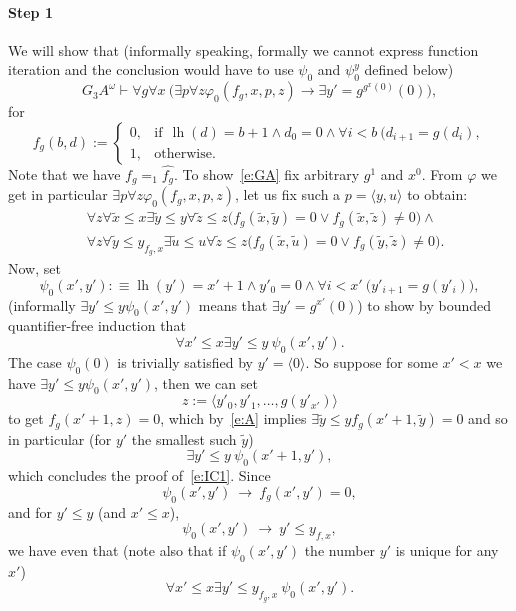 \documentclass[1p]{elsarticle}
\newcommand{\be}[1][{e:\arabic{equation}}] { \begin{equation}\label{#1} }
\newcommand{\ee} { \end{equation} }
\DeclareMathOperator{\lh}{lh}  %
\newcommand{\Tif}{\text{if}\ }
\newcommand{\Telse}{\text{otherwise}}
\theoremstyle{plain}
\theoremstyle{definition}
\theoremstyle{remark}
\renewenvironment{proof}[1][]{\noindent{\bf Proof{#1}. }}{\nopagebreak[4]{\hspace*{\fill}
  $\Box$              %
 }{\vspace{2ex}}}
\renewcommand{\phi}{\varphi}
\theoremstyle{definition}
\begin{document}
{\begin{proof}
\paragraph{Step 1} We will show that (informally speaking, formally we cannot express function iteration and the conclusion would have to use $\psi_0$ and $\psi^y_0$ defined below)
\[
G_3A^\omega\vdash \forall g \forall x\ \big(\exists p\forall z\phi_0(f_g,x,p,z)\rightarrow \exists y'=g^{g^{x}(0)}(0)\big),
\tag{GA}\label{e:GA}
\]
for \[
f_g(b,d):=\begin{cases}
0,&\Tif \ \lh(d) = b+1 \wedge d_0=0\wedge \forall i< b\ (d_{i+1}=g(d_i),\\
1,&\Telse.
\end{cases}
\]
Note that we have $f_g=_1\widehat{f_g}$. To show~\eqref{e:GA} fix arbitrary $g^1$ and $x^0$.
From $\phi$ we get in particular $\exists p\forall z\phi_0(f_g,x,p,z)$, let us fix such a $p=\langle y,u\rangle$ to obtain:
\begin{align}
&\forall z\forall\tilde x \leq x \exists \tilde y\leq y \forall \tilde z\leq z 
\big(f_g(\tilde x,\tilde y)=0\vee f_g(\tilde x,\tilde z)\neq0\big) \label{e:A}
\wedge \\
&\forall z\forall\tilde y \leq y_{f_g,x} \exists \tilde u\leq u \forall \tilde z\leq z 
\big(f_g(\tilde x,\tilde u)=0\vee f_g(\tilde y,\tilde z)\neq0\big). \label {e:B}
\end{align}
Now, set 
\[
\psi_0(x',y'):\equiv \lh(y')=x'+1 \wedge y'_0=0 \wedge \forall i< x'\ \big( y'_{i+1}=g(y'_i) \big),
\]
(informally $\exists y'\leq y\psi_0(x',y')$ means that $\exists y'=g^{x'}(0)$) to show by bounded quantifier-free induction that
\be[e:IC1]
\forall x'\leq x \exists y'\leq y\ \psi_0(x',y').
\ee
The case $\psi_0(0)$ is trivially satisfied by $y'=\langle 0 \rangle$. So suppose for some $x'<x$ we have
$\exists y'\leq y\psi_0(x',y')$, then we can set 
\[
z:=\langle y'_0,y'_1,\ldots,g(y'_{x'})\rangle
\] to get $f_g(x'+1,z)=0$,
which by~\eqref{e:A} implies $\exists \tilde y\leq y f_g(x'+1, \tilde y)=0$ and so in particular (for $y'$ the smallest such $\tilde y$)
\[
\exists y'\leq y\ \psi_0(x'+1,y'),
\]
which concludes the proof of~\eqref{e:IC1}. Since \[ \psi_0(x',y')\ \rightarrow\ f_g(x',y')=0,\] 
and for $y'\leq y$ (and $x'\leq x$),
\[ \psi_0(x',y')\ \rightarrow\ y'\leq y_{f,x},\] 
we have even that (note also that if $\psi_0(x',y')$ the number $y'$ is unique for any $x'$)\\
\be[e:IC1+]
\forall x'\leq x \exists y'\leq y_{f_g,x}\ \psi_0(x',y').
\ee


\end{proof}}
\end{document}
